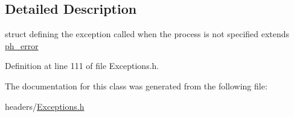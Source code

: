 \subsection{Detailed Description}
struct defining the exception called when the process is not specified extends \hyperlink{structph__error}{ph\+\_\+error} 

Definition at line 111 of file Exceptions.\+h.



The documentation for this class was generated from the following file\+:\begin{DoxyCompactItemize}
\item 
headers/\hyperlink{Exceptions_8h}{Exceptions.\+h}\end{DoxyCompactItemize}
